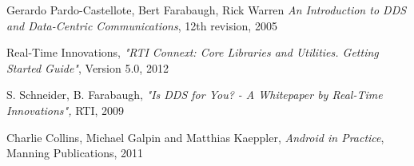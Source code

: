 \begin{thebibliography}{9}

Gerardo Pardo-Castellote, Bert Farabaugh, Rick Warren
\emph{An Introduction to DDS and Data-Centric Communications}, 12th revision, 2005

Real-Time Innovations, \emph{"RTI Connext: Core Libraries and Utilities. Getting Started
Guide"}, Version 5.0, 2012

S. Schneider, B. Farabaugh, \emph{"Is DDS for You? - A Whitepaper by Real-Time Innovations",}
RTI, 2009

Charlie Collins, Michael Galpin and Matthias Kaeppler, \emph{Android in Practice}, Manning Publications, 2011


\end{thebibliography} 